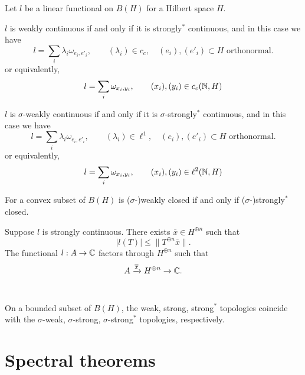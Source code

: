 \documentclass{../../large}
\begin{document}
\begin{prb}
Let $l$ be a linear functional on $B(H)$ for a Hilbert space $H$.
\begin{parts}
\item
$l$ is weakly continuous if and only if it is strongly$^*$ continuous, and in this case we have
\[l=\sum_i\lambda_i\omega_{e_i,e'_i},\qquad(\lambda_i)\in c_c,\quad(e_i),(e'_i)\subset H\text{ orthonormal}.\]
or equivalently,
\[l=\sum_i\omega_{x_i,y_i},\qquad(x_i),(y_i)\in c_c(\mathbb{N},H)\]
\item
$l$ is $\sigma$-weakly continuous if and only if it is $\sigma$-strongly$^*$ continuous, and in this case we have 
\[l=\sum_i\lambda_i\omega_{e_i,e'_i},\qquad(\lambda_i)\in\ell^1,\quad(e_i),(e'_i)\subset H\text{ orthonormal}.\]
or equivalently,
\[l=\sum_i\omega_{x_i,y_i},\qquad(x_i),(y_i)\in\ell^2(\mathbb{N},H)\]
\item For a convex subset of $B(H)$ is ($\sigma$-)weakly closed if and only if ($\sigma$-)strongly$^*$ closed.
\end{parts}
\end{prb}
\begin{pf}
Suppose $l$ is strongly continuous.
There exists $\bar x\in H^{\oplus n}$ such that
\[|l(T)|\le\|T^{\oplus n}\bar x\|.\]
The functional $l:A\to\mathbb{C}$ factors through $H^{\oplus n}$ such that
\[A\xrightarrow{\overline x}H^{\oplus n}\to\mathbb{C}.\]
\end{pf}

\begin{prb}[]
\,
\begin{parts}
\item On a bounded subset of $B(H)$, the weak, strong, strong$^*$ topologies coincide with the $\sigma$-weak, $\sigma$-strong, $\sigma$-strong$^*$ topologies, respectively.
\end{parts}
\end{prb}




\section{Spectral theorems}
\end{document}
